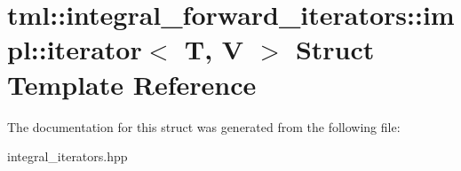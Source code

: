 \hypertarget{structtml_1_1integral__forward__iterators_1_1impl_1_1iterator}{\section{tml\+:\+:integral\+\_\+forward\+\_\+iterators\+:\+:impl\+:\+:iterator$<$ T, V $>$ Struct Template Reference}
\label{structtml_1_1integral__forward__iterators_1_1impl_1_1iterator}
}


The documentation for this struct was generated from the following file\+:\begin{DoxyCompactItemize}
\item 
integral\+\_\+iterators.\+hpp\end{DoxyCompactItemize}
